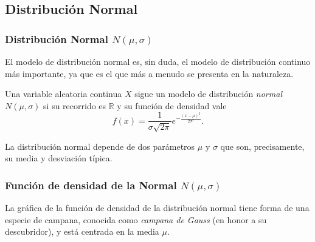 \subsection{Distribución Normal}

\begin{frame}
\frametitle{Distribución Normal $N(\mu,\sigma)$}
El modelo de distribución normal es, sin duda, el modelo de distribución continuo más importante, ya que es el que más a menudo se presenta
en la naturaleza.
\begin{definicion}
Una variable aleatoria continua $X$ sigue un modelo de distribución \emph{normal} $N(\mu,\sigma)$ si su recorrido es $\mathbb{R}$ y su función de densidad vale
\[
f(x)= \frac{1}{\sigma\sqrt{2\pi}}e^{-\frac{(x-\mu)^2}{2\sigma^2}}.
\]
\end{definicion}

La distribución normal depende de dos parámetros $\mu$ y $\sigma$ que son, precisamente, su media y desviación típica.

\end{frame}


\begin{frame}
\frametitle{Función de densidad de la Normal $N(\mu,\sigma)$}
La gráfica de la función de densidad de la distribución normal tiene forma de una especie de campana, conocida como \emph{campana de Gauss}
(en honor a su descubridor), y está centrada en la media $\mu$.
\begin{center}
\scalebox{0.65}{}
\end{center}

\end{frame}


